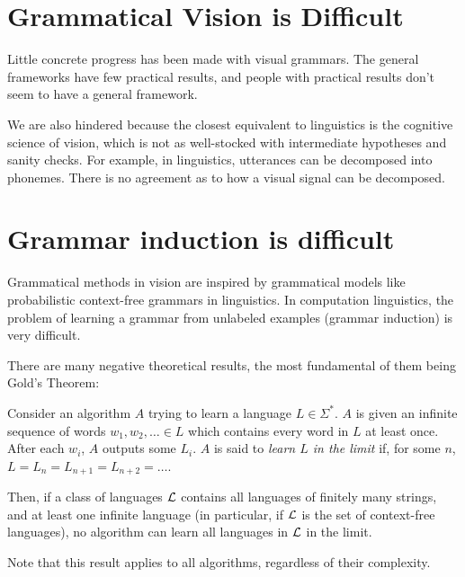 


\section{Grammatical Vision is Difficult}

Little concrete progress has been made with visual grammars. The
general frameworks have few practical results, and people with
practical results don't seem to have a general framework.  

We are also hindered because the closest equivalent to linguistics is
the cognitive science of vision, which is not as well-stocked with
intermediate hypotheses and sanity checks. For example, in
linguistics, utterances can be decomposed into phonemes. There is no
agreement as to how a visual signal can be decomposed.

\section{Grammar induction is difficult}
\label{sec-gram-hard}

Grammatical methods in vision are inspired by grammatical models like
probabilistic context-free grammars in linguistics. In computation
linguistics, the problem of learning a grammar from unlabeled examples
(grammar induction) is very difficult.

There are many \cite{lee-induction} negative theoretical results, the
most fundamental of them being Gold's Theorem:

\begin{thm}
Consider an algorithm $A$ trying to learn a language $L\in \Sigma^*$.
$A$ is given an infinite sequence of words $w_1, w_2, \dots\in L$ which
contains every word in $L$ at least once. After each $w_i$, $A$
outputs some $L_i$. $A$ is said to {\em learn $L$ in the limit} if,
for some $n$, $L = L_n = L_{n+1} = L_{n+2} = \dots$.

Then, if a class of languages ${\mathcal L}$ contains all languages of
finitely many strings, and at least one infinite language (in
particular, if ${\mathcal L}$ is the set of context-free languages), no
algorithm can learn all languages in ${\mathcal L}$ in the limit.
\end{thm}
Note that this result applies to all algorithms, regardless of their
complexity. 


